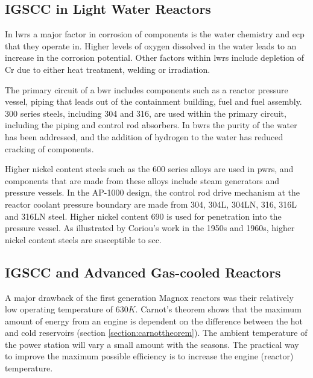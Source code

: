 \FloatBarrier

\subsection{IGSCC in Light Water Reactors}

In \acrshort{lwr}s a major factor in corrosion of components is the water chemistry and \acrlong{ecp} that they operate in.  Higher levels of oxygen dissolved in the water leads to an increase in the corrosion potential\cite{wasstrucaustenitic}.  Other factors within \acrshort{lwr}s include depletion of \Gls{Cr} due to either heat treatment, welding or irradiation.

The primary circuit of a \acrshort{bwr} includes components such as a reactor pressure vessel, piping that leads out of the containment building, fuel and fuel assembly.  300 series steels, including 304 and 316, are used within the primary circuit, including the piping and control rod absorbers.  In \acrshort{bwr}s the purity of the water has been addressed, and the addition of hydrogen to the water has reduced cracking of components\cite{staehlecoriou}.  

Higher nickel content steels such as the 600 series alloys are used in \acrshort{pwr}s, and components that are made from these alloys include steam generators and pressure vessels.  In the AP-1000 design, the control rod drive mechanism at the reactor coolant pressure boundary are made from 304, 304L, 304LN, 316, 316L and 316LN steel.  Higher nickel content 690 is used for penetration into the pressure vessel\cite{ap1000dcd}.  As illustrated by Coriou's work in the 1950s and 1960s, higher nickel content steels are susceptible to \acrlong{scc}.

\FloatBarrier
\subsection{IGSCC and Advanced Gas-cooled Reactors}

A major drawback of the first generation Magnox reactors was their relatively low operating temperature of $630K$.  Carnot's theorem shows that the maximum amount of energy from an engine is dependent on the difference between the hot and cold reservoirs (section \ref{section:carnottheorem}).  The ambient temperature of the power station will vary a small amount with the seasons.  The practical way to improve the maximum possible efficiency is to increase the engine (reactor) temperature.

